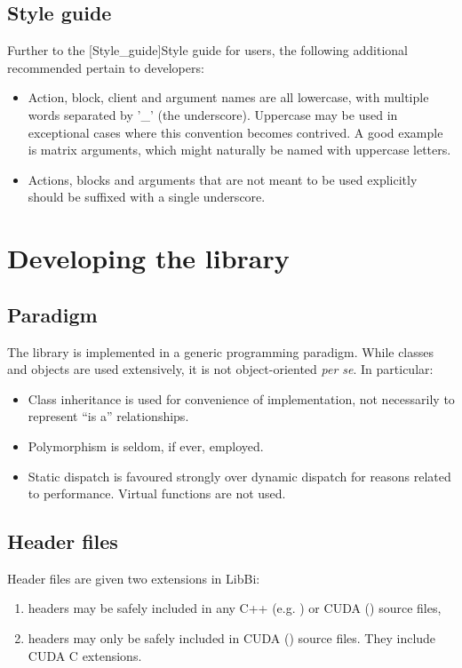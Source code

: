 \subsection{Style guide\label{Developer_style_guide}}

Further to the \hyperref[hyper][Style_guide]{Style guide} for users, the
following additional recommended pertain to developers:
\begin{itemize}
\item Action, block, client and argument names are all lowercase, with
  multiple words separated by '\_' (the underscore). Uppercase may be used in
  exceptional cases where this convention becomes contrived. A good example is
  matrix arguments, which might naturally be named with uppercase letters.
\item Actions, blocks and arguments that are not meant to be used explicitly
  should be suffixed with a single underscore.
\end{itemize}

\section{Developing the library}

\subsection{Paradigm}

The library is implemented in a generic programming paradigm. While classes
and objects are used extensively, it is not object-oriented \textsl{per
  se}. In particular:
\begin{itemize}
\item Class inheritance is used for convenience of implementation, not
  necessarily to represent ``is a'' relationships.
\item Polymorphism is seldom, if ever, employed.
\item Static dispatch is favoured strongly over dynamic dispatch for
  reasons related to performance. Virtual functions are not used.
\end{itemize}

\subsection{Header files}

Header files are given two extensions in LibBi:
\begin{enumerate}
\item {} headers may be safely included in any C++ (e.g.
) or CUDA () source files,
\item {} headers may only be safely included in CUDA ()
source files. They include CUDA C extensions.
\end{enumerate}


